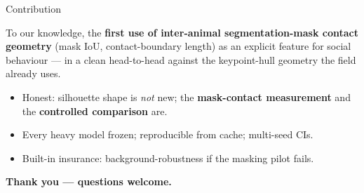 \documentclass[aspectratio=169,11pt]{beamer}
\begin{document}
\begin{frame}{Contribution}
\begin{block}{}
\centering To our knowledge, the \textbf{first use of inter-animal segmentation-mask contact
    geometry} (mask IoU, contact-boundary length) as an explicit feature for social behaviour —
    in a clean head-to-head against the keypoint-hull geometry the field already uses.
\end{block}
\vspace{0.5em}
\begin{itemize}\itemsep0.4em
\item Honest: silhouette shape is \emph{not} new; the \textbf{mask-contact measurement} and the
\textbf{controlled comparison} are.
\item Every heavy model frozen; reproducible from cache; multi-seed CIs.
\item Built-in insurance: background-robustness if the masking pilot fails.
\end{itemize}
\vspace{0.5em}
\centering\small\color{navy}\textbf{Thank you — questions welcome.}
\end{frame}
\end{document}
